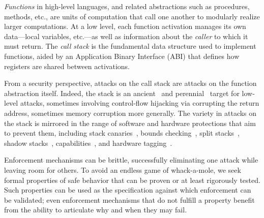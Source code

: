 \documentclass[10pt,conference]{ieeetran}%
\theoremstyle{definition}
\begin{document}

{\em Functions} in high-level languages, and related abstractions such
as procedures, methods, etc., are units of computation
that call one another to modularly realize larger computations.
%
At a low level, each function activation manages its own data---local
variables, etc.---as well as information about the \emph{caller} to
which it must return.
%
The \emph{call stack} is the fundamental data structure used to
implement functions, aided by an Application Binary Interface (ABI)
that defines how registers are shared between activations.

From a security perspective, attacks on the call stack
are attacks on the function abstraction itself.
%
Indeed, the stack is an ancient~\cite{phrack96:smashingthestack} and
perennial~\cite{mitre-cwe,DBLP:conf/raid/VeendCB12,
  DBLP:conf/sp/SzekeresPWS13,
  DBLP:conf/sp/HuSACSL16,msrc-bluehat,chromium-security}
target for low-level attacks, sometimes involving control-flow
hijacking via corrupting the return address, sometimes memory corruption
more generally.
%
%
The variety in attacks on the stack is mirrored in the range of
software and hardware protections that aim to prevent them,
%
including stack canaries~\cite{Cowan+98},
bounds checking~\cite{NagarakatteZMZ09,NagarakatteZMZ10,DeviettiBMZ08},
split stacks~\cite{Kuznetsov+14},
shadow stacks~\cite{Dang+15,Shanbhogue+19},
capabilities~\cite{Woodruff+14,Chisnall+15,SkorstengaardLocal,SkorstengaardSTKJFP,Georges22:TempsDesCerises},
and hardware tagging~\cite{DBLP:conf/sp/RoesslerD18,Gollapudi+23}.

Enforcement mechanisms can be brittle, successfully eliminating one
attack while leaving room for others. To avoid an endless game of
whack-a-mole, we seek formal properties of safe behavior that can be
proven or at least rigorously tested. Such properties can be used as
the specification against which enforcement can be validated; even
enforcement mechanisms that do not fulfill a property benefit from the
ability to articulate why and when they may fail.
\end{document}
